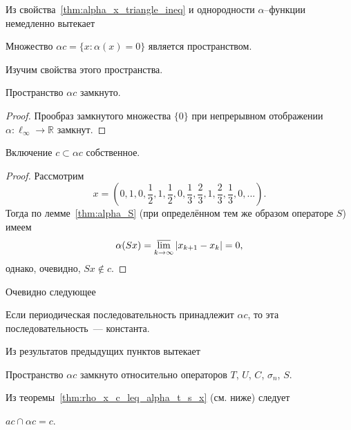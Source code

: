 Из свойства~\ref{thm:alpha_x_triangle_ineq} и однородности $\alpha$--функции немедленно вытекает
\begin{theorem}
	Множество $\alpha c = \{x: \alpha(x) = 0\}$
	является пространством.
\end{theorem}
Изучим свойства этого пространства.
\begin{property}
	Пространство $\alpha c$ замкнуто.
\end{property}
\begin{proof}
	Прообраз замкнутого множества $\{0\}$
	при непрерывном отображении $\alpha : \ell_\infty \to \mathbb{R}$
	замкнут.
\end{proof}
\begin{theorem}
	Включение $c \subset \alpha c$ собственное.
\end{theorem}
\begin{proof}
	Рассмотрим
	\begin{equation}
		x=\left(
			0,1,
			0,\frac{1}{2},1,\frac{1}{2},
			0,\frac{1}{3},\frac{2}{3},1,\frac{2}{3},\frac{1}{3},
			0,
			...
		\right)
		.
	\end{equation}
	Тогда по лемме~\ref{thm:alpha_S} (при определённом тем же образом операторе $S$) имеем
	\begin{equation}
		\alpha(Sx) = \varlimsup_{k\to\infty} |x_{k+1} - x_{k}| = 0
		,
	\end{equation}
	однако, очевидно, $Sx\notin c$.
\end{proof}
Очевидно следующее
\begin{property}
	Если периодическая последовательность принадлежит $\alpha c$,
	то эта последовательность~--- константа.
\end{property}

Из результатов предыдущих пунктов вытекает
\begin{theorem}
	Пространство $\alpha c$ замкнуто относительно операторов $T$, $U$, $C$, $\sigma_n$, $S$.
\end{theorem}

Из теоремы~\ref{thm:rho_x_c_leq_alpha_t_s_x} (см. ниже) следует
\begin{theorem}
	$ac \cap\alpha c = c$.
\end{theorem}
